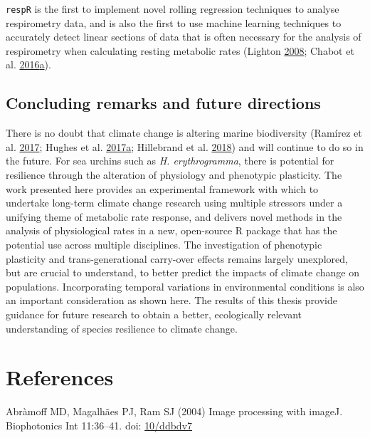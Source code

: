 \documentclass[a4paper,10pt, oneside]{memoir}
\begin{document}
\texttt{respR} is the first to implement novel rolling regression techniques to analyse respirometry data, and is also the first to use machine learning techniques to accurately detect linear sections of data that is often necessary for the analysis of respirometry when calculating resting metabolic rates (Lighton \protect\hyperlink{ref-Lighton2008}{2008}; Chabot et al. \protect\hyperlink{ref-Chabot2016b}{2016}\protect\hyperlink{ref-Chabot2016b}{a}).

\hypertarget{concluding-remarks-and-future-directions}{%
\section{Concluding remarks and future directions}\label{concluding-remarks-and-future-directions}}

There is no doubt that climate change is altering marine biodiversity (Ramírez et al. \protect\hyperlink{ref-Ramirez2017}{2017}; Hughes et al. \protect\hyperlink{ref-Hughes2017}{2017}\protect\hyperlink{ref-Hughes2017}{a}; Hillebrand et al. \protect\hyperlink{ref-Hillebrand2018}{2018}) and will continue to do so in the future.
For sea urchins such as \emph{H. erythrogramma}, there is potential for resilience through the alteration of physiology and phenotypic plasticity.
The work presented here provides an experimental framework with which to undertake long-term climate change research using multiple stressors under a unifying theme of metabolic rate response, and delivers novel methods in the analysis of physiological rates in a new, open-source R package that has the potential use across multiple disciplines.
The investigation of phenotypic plasticity and trans-generational carry-over effects remains largely unexplored, but are crucial to understand, to better predict the impacts of climate change on populations.
Incorporating temporal variations in environmental conditions is also an important consideration as shown here.
The results of this thesis provide guidance for future research to obtain a better, ecologically relevant understanding of species resilience to climate change.

\hypertarget{references}{%
\chapter*{References}\label{references}}

\SingleSpacing

\hypertarget{refs}{}
\leavevmode\hypertarget{ref-Abramoff2004}{}%
Abràmoff MD, Magalhães PJ, Ram SJ (2004) Image processing with imageJ. Biophotonics Int 11:36--41. doi: \href{https://doi.org/10/ddbdv7}{10/ddbdv7}
\end{document}
